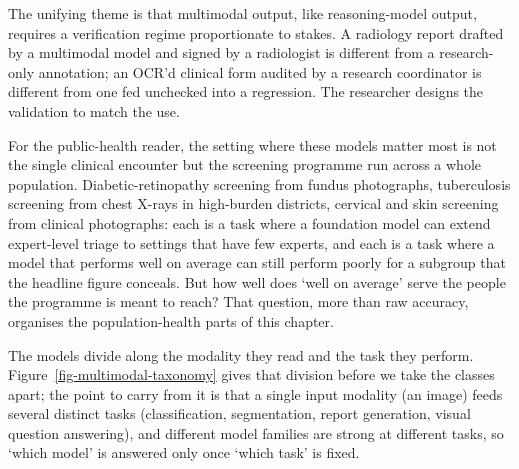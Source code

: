 \documentclass[
  letterpaper,
  11pt]{scrbook}
\begin{document}
The unifying theme is that multimodal output, like reasoning-model
output, requires a verification regime proportionate to stakes. A
radiology report drafted by a multimodal model and signed by a
radiologist is different from a research-only annotation; an OCR'd
clinical form audited by a research coordinator is different from one
fed unchecked into a regression. The researcher designs the validation
to match the use.

For the public-health reader, the setting where these models matter most
is not the single clinical encounter but the screening programme run
across a whole population. Diabetic-retinopathy screening from fundus
photographs, tuberculosis screening from chest X-rays in high-burden
districts, cervical and skin screening from clinical photographs: each
is a task where a foundation model can extend expert-level triage to
settings that have few experts, and each is a task where a model that
performs well on average can still perform poorly for a subgroup that
the headline figure conceals. But how well does `well on average' serve
the people the programme is meant to reach? That question, more than raw
accuracy, organises the population-health parts of this chapter.

The models divide along the modality they read and the task they
perform. Figure~\ref{fig-multimodal-taxonomy} gives that division before
we take the classes apart; the point to carry from it is that a single
input modality (an image) feeds several distinct tasks (classification,
segmentation, report generation, visual question answering), and
different model families are strong at different tasks, so `which model'
is answered only once `which task' is fixed.
\end{document}
